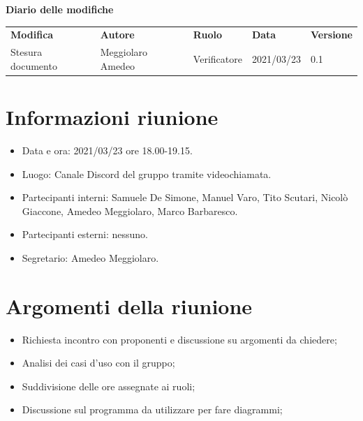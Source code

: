 \documentclass[a4paper]{article}
\begin{document}
        \begin{center}
            \textbf{\Large Diario delle modifiche}\\
            \vspace{10px}
            \begin{table}[h!]
            \centering
            \renewcommand{\arraystretch}{1.8}
            \begin{tabular}{p{150px} p{90px} p{50px} p{60px} p{45px}}
                \rowcolor{logo!70} \textbf{Modifica} & \textbf{Autore} & \textbf{Ruolo} & \textbf{Data} & \textbf{Versione}\\
                Stesura documento & Meggiolaro Amedeo & Verificatore & 2021/03/23 & 0.1\\   
            \end{tabular}
        \end{table}
        \end{center}
    
        \newpage
        \tableofcontents
        \newpage

    \section{Informazioni riunione}
    \begin{itemize}
        \item Data e ora: 2021/03/23 ore 18.00-19.15.
        \item Luogo: Canale Discord del gruppo tramite videochiamata.
        \item Partecipanti interni: Samuele De Simone, Manuel Varo, Tito Scutari, Nicolò Giaccone, Amedeo Meggiolaro, Marco Barbaresco.
        \item Partecipanti esterni: nessuno.
        \item Segretario: Amedeo Meggiolaro.
    \end{itemize}
    \section{Argomenti della riunione}
    \begin{itemize}
        \item Richiesta incontro con proponenti e discussione su argomenti da chiedere;
        \item Analisi dei casi d'uso con il gruppo;
        \item Suddivisione delle ore assegnate ai ruoli;
        \item Discussione sul programma da utilizzare per fare diagrammi;
    \end{itemize}
\end{document}
